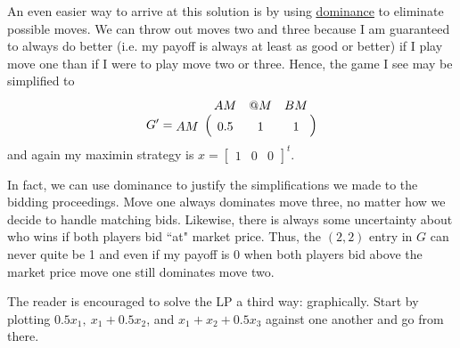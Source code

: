 \documentclass[11pt, oneside]{article}     %
\begin{document}
An even easier way to arrive at this solution is by using 
\href{http://en.wikipedia.org/wiki/Strategic_dominance}{\uline{dominance}}
to eliminate possible moves. We can throw out
moves two and three because I am guaranteed to always do better (i.e. my payoff
is always at least as good or better) if I play move one than if I were to play 
move two or three. Hence, the game I see may be simplified to
\begin{align*}
G' = \bordermatrix{
      &   AM & @M & BM\cr
      AM & 0.5 & 1 & 1}
\end{align*}
and again my maximin strategy is $x = \begin{bmatrix}1 & 0 & 0 \end{bmatrix}^t$.

In fact, we can use dominance to justify the simplifications we made to the bidding proceedings. Move one always dominates move
three, no matter how we decide to handle matching bids. Likewise,
there is always some uncertainty about who wins if
both players bid ``at" market price. Thus, the $(2, 2)$ entry in
$G$ can never quite be 1 and even if my payoff is 0 when both players bid above the market price move one still dominates move two.



The reader is encouraged to solve the LP a third way: graphically. Start by plotting 
$0.5x_1,~x_1 + 0.5x_2$, and $x_1 + x_2 + 0.5x_3$ against one another
and go from there.
\end{document}
